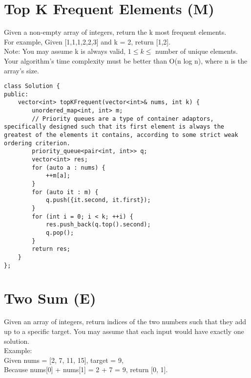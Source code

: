 \section{Top K Frequent Elements (M)}
Given a non-empty array of integers, return the k most frequent elements.\\

For example,
Given [1,1,1,2,2,3] and k = 2, return [1,2].\\

Note:
    You may assume k is always valid, $1 \leq k \leq $ number of unique elements.\\
    Your algorithm's time complexity must be better than O(n log n), where n is the array's size.\\

\begin{lstlisting}
class Solution {
public:
    vector<int> topKFrequent(vector<int>& nums, int k) {
        unordered_map<int, int> m;
        // Priority queues are a type of container adaptors, specifically designed such that its first element is always the greatest of the elements it contains, according to some strict weak ordering criterion.
        priority_queue<pair<int, int>> q;
        vector<int> res;
        for (auto a : nums) {
            ++m[a];
        }
        for (auto it : m) {
            q.push({it.second, it.first});
        }
        for (int i = 0; i < k; ++i) {
            res.push_back(q.top().second); 
            q.pop();
        }
        return res;
    }
};
\end{lstlisting}


\section{Two Sum (E)}
Given an array of integers, return indices of the two numbers such that they add up to a specific target. You may assume that each input would have exactly one solution. \\

Example:\\
Given nums = [2, 7, 11, 15], target = 9,\\
Because nums[0] + nums[1] = 2 + 7 = 9, return [0, 1].\\

